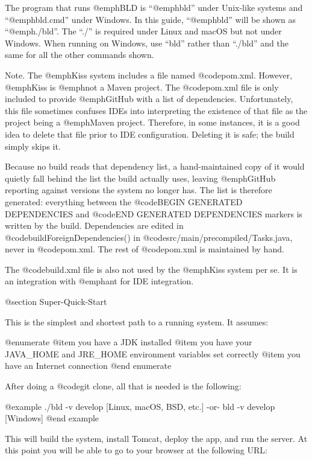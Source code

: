 The program that runs @emph{BLD} is ``@emph{bld}'' under Unix-like
systems and ``@emph{bld.cmd}'' under Windows.  In this guide,
``@emph{bld}'' will be shown as ``@emph{./bld}''.  The ``./'' is
required under Linux and macOS but not under Windows.  When running on
Windows, use ``bld'' rather than ``./bld'' and the same for all the
other commands shown.

Note.  The @emph{Kiss} system includes a file named @code{pom.xml}.
However, @emph{Kiss} is @emph{not} a Maven project.  The
@code{pom.xml} file is only included to provide @emph{GitHub} with a
list of dependencies.  Unfortunately, this file sometimes confuses IDEs
into interpreting the existence of that file as the project being a
@emph{Maven} project.  Therefore, in some instances, it is a good idea
to delete that file prior to IDE configuration.  Deleting it is safe;
the build simply skips it.

Because no build reads that dependency list, a hand-maintained copy of it
would quietly fall behind the list the build actually uses, leaving
@emph{GitHub} reporting against versions the system no longer has.  The
list is therefore generated: everything between the
@code{BEGIN GENERATED DEPENDENCIES} and @code{END GENERATED DEPENDENCIES}
markers is written by the build.  Dependencies are edited in
@code{buildForeignDependencies()} in @code{src/main/precompiled/Tasks.java},
never in @code{pom.xml}.  The rest of @code{pom.xml} is maintained by hand.

The @code{build.xml} file is also not used by the @emph{Kiss} system per se.
It is an integration with @emph{ant} for IDE integration.


@section Super-Quick-Start

This is the simplest and shortest path to a running system.  It assumes:

@enumerate
@item
you have a JDK installed
@item
you have your JAVA_HOME and JRE_HOME environment variables set correctly
@item
you have an Internet connection
@end enumerate

After doing a @code{git clone}, all that is needed is the following:

@example
    ./bld -v develop                      [Linux, macOS, BSD, etc.]
         -or-
    bld -v develop                        [Windows]
@end example

This will build the system, install Tomcat, deploy the app, and run
the server.  At this point you will be able to go to your browser at the
following URL:

